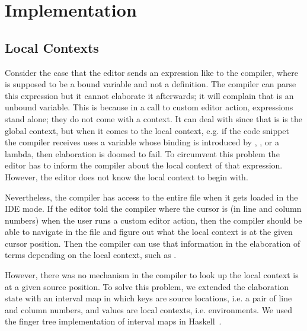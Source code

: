 \section{Implementation}\label{sec:implementation}


\subsection{Local Contexts}

Consider the case that the editor sends an expression like 
to the compiler, where  is supposed to be a bound variable and not a
definition.
The compiler can parse this expression but it cannot elaborate it afterwards;
it will complain that  is an unbound variable. This is because in a
call to custom editor action, expressions stand alone; they do not come with a
context. It can deal with  since that is is the global context, but
when it comes to the local context, e.g.  if the code snippet the compiler
receives uses a variable whose binding is introduced by , , or
a lambda, then elaboration is doomed to fail.
To circumvent this problem the editor has to inform the compiler about the
local context of that expression. However, the editor does not know the local
context to begin with.

Nevertheless, the compiler has access to the entire file when it gets loaded
in the IDE mode. If the editor told the compiler where the cursor is (in line
and column numbers) when the user runs a custom editor action, then the
compiler should be able to navigate in the file and figure out what the local
context is at the given cursor position. Then the compiler can use that information
in the elaboration of terms depending on the local context, such as
.

However, there was no mechanism in the compiler to look up the local context is
at a given source position.
To solve this problem, we extended the elaboration state with an interval map
in which keys are source locations, i.e. a pair of line and column numbers, and
values are local contexts, i.e. environments. We used the finger tree
implementation of interval maps in Haskell~\cite{fingertrees}.

